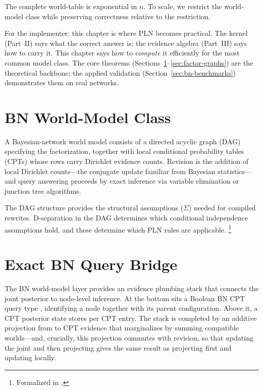 \documentclass[11pt,openany]{report}
\begin{document}
The complete world-table \JointEvidence{} is exponential in $n$.  To scale,
we restrict the world-model class while preserving correctness relative
to the restriction.

For the implementer: this chapter is where PLN becomes practical.  The
kernel (Part~II) says what the correct answer is; the evidence algebra
(Part~III) says how to carry it.  This chapter says how to
\emph{compute} it efficiently for the most common model class.  The core
theorems (Sections~\ref{sec:bn-class}--\ref{sec:factor-graphs}) are the
theoretical backbone; the applied validation
(Section~\ref{sec:bn-benchmarks}) demonstrates them on real networks.

\section{BN World-Model Class}
\label{sec:bn-class}

A Bayesian-network world model consists of a directed acyclic graph (DAG)
specifying the factorization, together with local conditional probability
tables (CPTs) whose rows carry Dirichlet evidence counts.  Revision is
the addition of local Dirichlet counts---the conjugate update familiar
from Bayesian statistics---and query answering proceeds by exact inference
via variable elimination or junction tree algorithms.

The DAG structure provides the structural assumptions ($\Sigma$) needed
for compiled rewrites.  D-separation in the DAG determines which
conditional independence assumptions hold, and these determine which
PLN rules are applicable.%
\footnote{Formalized in .}

\section{Exact BN Query Bridge}

The BN world-model layer provides an evidence plumbing stack that
connects the joint posterior to node-level inference.  At the bottom sits
a Boolean BN CPT query type , identifying a node together
with its parent configuration.  Above it, a CPT posterior state
 stores \Evidence{} per CPT entry.  The stack is completed
by an additive projection from \JointEvidence{} to CPT evidence that
marginalizes by summing compatible worlds---and, crucially, this
projection commutes with revision, so that updating the joint and then
projecting gives the same result as projecting first and updating locally.
\end{document}
